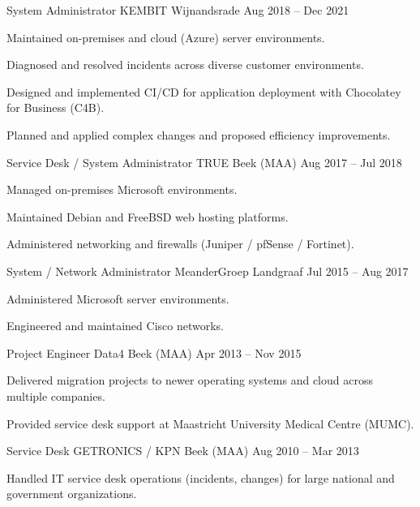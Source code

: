 \documentclass[11pt, a4paper]{awesome-cv}
\begin{document}
\begin{cventries}
  \cventry
    {System Administrator}
    {KEMBIT}
    {Wijnandsrade}
    {Aug 2018 -- Dec 2021}
    {
      \begin{cvitems}
        \item{Maintained on-premises and cloud (Azure) server environments.}
        \item{Diagnosed and resolved incidents across diverse customer environments.}
        \item{Designed and implemented CI/CD for application deployment with Chocolatey for Business (C4B).}
        \item{Planned and applied complex changes and proposed efficiency improvements.}
      \end{cvitems}
    }


  \cventry
    {Service Desk / System Administrator}
    {TRUE}
    {Beek (MAA)}
    {Aug 2017 -- Jul 2018}
    {
      \begin{cvitems}
        \item{Managed on-premises Microsoft environments.}
        \item{Maintained Debian and FreeBSD web hosting platforms.}
        \item{Administered networking and firewalls (Juniper / pfSense / Fortinet).}
      \end{cvitems}
    }


  \cventry
    {System / Network Administrator}
    {MeanderGroep}
    {Landgraaf}
    {Jul 2015 -- Aug 2017}
    {
      \begin{cvitems}
        \item{Administered Microsoft server environments.}
        \item{Engineered and maintained Cisco networks.}
      \end{cvitems}
    }


  \cventry
    {Project Engineer}
    {Data4}
    {Beek (MAA)}
    {Apr 2013 -- Nov 2015}
    {
      \begin{cvitems}
        \item{Delivered migration projects to newer operating systems and cloud across multiple companies.}
        \item{Provided service desk support at Maastricht University Medical Centre (MUMC).}
      \end{cvitems}
    }


  \cventry
    {Service Desk}
    {GETRONICS / KPN}
    {Beek (MAA)}
    {Aug 2010 -- Mar 2013}
    {
      \begin{cvitems}
        \item{Handled IT service desk operations (incidents, changes) for large national and government organizations.}
      \end{cvitems}
    }



\end{cventries}
\end{document}
